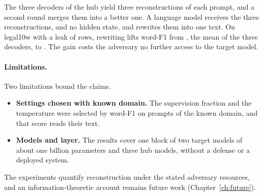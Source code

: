 The three decoders of the hub yield three reconstructions of each prompt, and a second round merges them into a better one.
A language model receives the three reconstructions, and no hidden state, and rewrites them into one text.
On legal10w with a leak of  rows, rewriting lifts word-F1 from , the mean of the three decoders, to . %
The gain costs the adversary no further access to the target model.

\paragraph{Limitations.} Two limitations bound the claims.
\begin{itemize}
\item \textbf{Settings chosen with known domain.} The supervision fraction and the temperature were selected by word-F1 on  prompts of the known domain, and that score reads their text.
\item \textbf{Models and layer.} The results cover one block of two target models of about one billion parameters and three hub models, without a defense or a deployed system.
\end{itemize}

The experiments quantify reconstruction under the stated adversary resources, and an information-theoretic account remains future work (Chapter~\ref{ch:future}).
